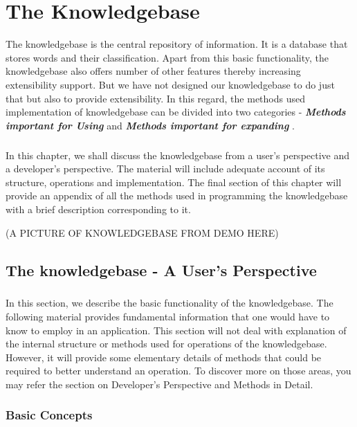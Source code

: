 \chapter{The Knowledgebase}

The knowledgebase is the central repository of information. It is a database that stores words and their classification. Apart from this basic functionality, the knowledgebase also offers number of other features thereby increasing extensibility support. 
But we have not designed our knowledgebase to do just that but also to provide extensibility. In this regard, the methods used implementation of knowledgebase can be divided into two categories - \textbf{\emph{Methods important for Using \libalf}} and \textbf{\emph{Methods important for expanding \libalf}}. 
\paragraph{}
In this chapter, we shall discuss the knowledgebase from a user's perspective and a developer's perspective. The material will include adequate account of its structure, operations and implementation.  The final section of this chapter will provide an appendix of all the methods used in programming the knowledgebase with a brief description corresponding to it.  

(A PICTURE OF KNOWLEDGEBASE FROM DEMO HERE)

\section{The knowledgebase - A User's Perspective}

\paragraph{} In this section, we describe the basic functionality of the knowledgebase. The following material provides fundamental information that one would have to know to employ \libalf in an application. This section will not deal with explanation of the internal structure or methods used for operations of the knowledgebase. However, it will provide some elementary details of methods that could be required to better understand an operation.  To discover more on those areas, you may refer the section on Developer's Perspective and Methods in Detail.

\subsection*{Basic Concepts}
	
